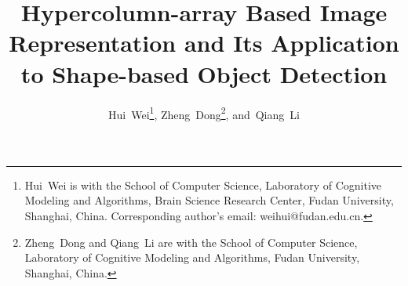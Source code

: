 \documentclass[journal]{IEEEtran}
\begin{document}
\title{Hypercolumn-array Based Image Representation and 
Its Application to Shape-based Object Detection}
\author{Hui~Wei\thanks{Hui~Wei is with the School of Computer Science, 
Laboratory of Cognitive Modeling and Algorithms, 
Brain Science Research Center, Fudan University, Shanghai, China. 
Corresponding author's email: weihui@fudan.edu.cn.},
Zheng~Dong\thanks{Zheng~Dong and Qiang~Li are with the School of Computer Science, 
Laboratory of Cognitive Modeling and Algorithms, 
Fudan University, Shanghai, China.},
and~Qiang~Li}


\maketitle
\end{document}
